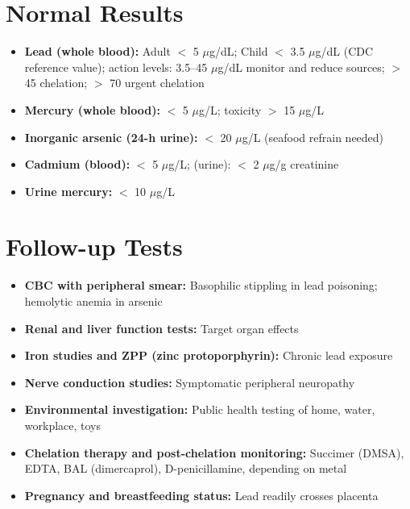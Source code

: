 \section*{Normal Results}
\begin{itemize}
  \item \textbf{Lead (whole blood):} Adult $<$ 5 $\mu$g/dL; Child $<$ 3.5 $\mu$g/dL (CDC reference value); action levels: 3.5--45 $\mu$g/dL monitor and reduce sources; $>$ 45 chelation; $>$ 70 urgent chelation
  \item \textbf{Mercury (whole blood):} $<$ 5 $\mu$g/L; toxicity $>$ 15 $\mu$g/L
  \item \textbf{Inorganic arsenic (24-h urine):} $<$ 20 $\mu$g/L (seafood refrain needed)
  \item \textbf{Cadmium (blood):} $<$ 5 $\mu$g/L; (urine): $<$ 2 $\mu$g/g creatinine
  \item \textbf{Urine mercury:} $<$ 10 $\mu$g/L
\end{itemize}

\section*{Follow-up Tests}
\begin{itemize}
  \item \textbf{CBC with peripheral smear:} Basophilic stippling in lead poisoning; hemolytic anemia in arsenic
  \item \textbf{Renal and liver function tests:} Target organ effects
  \item \textbf{Iron studies and ZPP (zinc protoporphyrin):} Chronic lead exposure
  \item \textbf{Nerve conduction studies:} Symptomatic peripheral neuropathy
  \item \textbf{Environmental investigation:} Public health testing of home, water, workplace, toys
  \item \textbf{Chelation therapy and post-chelation monitoring:} Succimer (DMSA), EDTA, BAL (dimercaprol), D-penicillamine, depending on metal
  \item \textbf{Pregnancy and breastfeeding status:} Lead readily crosses placenta
\end{itemize}

